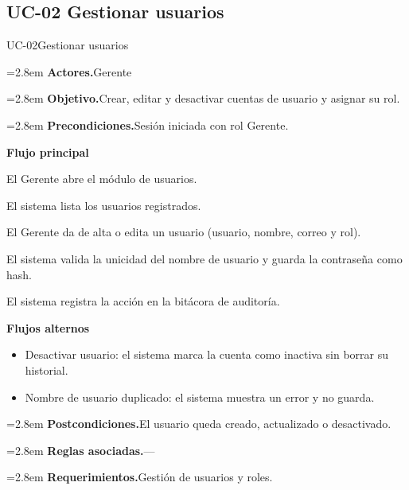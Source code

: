 \documentclass[11pt]{article}
\newcommand{\fila}[2]{\par\smallskip\noindent\hangindent=2.8em\hangafter=0
  \textbf{\sffamily\color{brand!80!black}#1.}\hspace{0.4em}#2\par}
\newcommand{\bloque}[1]{\par\smallskip\noindent\textbf{\sffamily\color{brand!80!black}#1}\par\nopagebreak}
\newenvironment{alternos}{\begin{itemize}[leftmargin=2.9em, itemsep=0.2ex, topsep=0.3ex]}{\end{itemize}}
\begin{document}
\subsection{UC-02 Gestionar usuarios}
\begin{ficha}{UC-02}{Gestionar usuarios}
\fila{Actores}{Gerente}
\fila{Objetivo}{Crear, editar y desactivar cuentas de usuario y asignar su rol.}
\fila{Precondiciones}{Sesión iniciada con rol Gerente.}
\bloque{Flujo principal}
\begin{pasos}
  \item El Gerente abre el módulo de usuarios.
  \item El sistema lista los usuarios registrados.
  \item El Gerente da de alta o edita un usuario (usuario, nombre, correo y rol).
  \item El sistema valida la unicidad del nombre de usuario y guarda la contraseña como hash.
  \item El sistema registra la acción en la bitácora de auditoría.
\end{pasos}
\bloque{Flujos alternos}
\begin{alternos}
  \item[\textbf{3a.}] Desactivar usuario: el sistema marca la cuenta como inactiva sin borrar su historial.
  \item[\textbf{4a.}] Nombre de usuario duplicado: el sistema muestra un error y no guarda.
\end{alternos}
\fila{Postcondiciones}{El usuario queda creado, actualizado o desactivado.}
\fila{Reglas asociadas}{---}
\fila{Requerimientos}{Gestión de usuarios y roles.}
\end{ficha}
\end{document}
